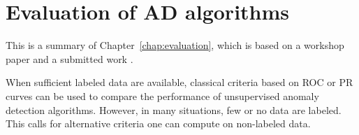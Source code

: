 




\section{Evaluation of AD algorithms}
\label{resume:evaluation}
This is a summary of Chapter~\ref{chap:evaluation}, which is based on a workshop paper \citep{ICMLworkshop16} and a submitted work \citep{NIPS16evaluation}.


When sufficient labeled data are available, classical criteria based on ROC \citep{Provost1997, Provost1998, Fawcett2006} or PR \citep{Davis2006, Clemencon2009} curves can be used to compare the performance of unsupervised anomaly detection algorithms. However, in many situations, few or no data are labeled. This calls for alternative criteria one can compute on non-labeled data.

